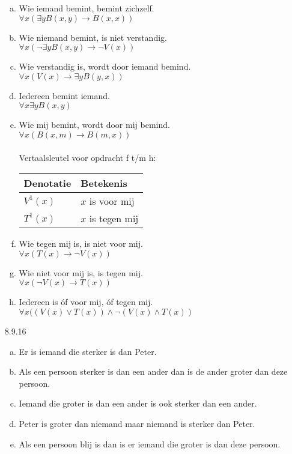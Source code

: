 \begin{enumerate}
\begin{enumerate}[(a)]
      \item
        Wie iemand bemint, bemint zichzelf.\\
        $\forall x ( \exists y B(x,y) \rightarrow B(x,x) )$
      \item
        Wie niemand bemint, is niet verstandig.\\
        $\forall x ( \neg \exists y B(x,y) \rightarrow \neg V(x))$
      \item
        Wie verstandig is, wordt door iemand bemind.\\
        $\forall x ( V(x) \to \exists y B(y,x))$
      \item
        Iedereen bemint iemand.\\
        $\forall x \exists y B(x,y)$
      \item
        Wie mij bemint, wordt door mij bemind.\\
        $\forall x ( B(x,m) \to B(m,x))$
        \\\\
        Vertaalsleutel voor opdracht f t/m h: \\
        \begin{tabular}{l|l}
          Denotatie & Betekenis\\
          \hline
          $V^1(x)$ & $x$ is voor mij\\
          $T^1(x)$ & $x$ is tegen mij\\
        \end{tabular}
      \item
        Wie tegen mij is, is niet voor mij.\\
        $\forall x ( T(x) \rightarrow \neg V(x) )$
      \item
        Wie niet voor mij is, is tegen mij.\\
        $\forall x ( \neg V(x) \rightarrow T(x) )$
      \item
        Iedereen is óf voor mij, óf tegen mij.\\
        $\forall x ( ( V(x) \vee T(x) ) \land \neg( V(x) \land T(x) )$
    \end{enumerate}

    \item[8.9.16]
    \newline
    \begin{enumerate}[(a)]
      \item Er is iemand die sterker is dan Peter.
      \item Als een persoon sterker is dan een ander dan is de ander groter dan deze persoon.
      \item Iemand die groter is dan een ander is ook sterker dan een ander.
      \item Peter is groter dan niemand maar niemand is sterker dan Peter.
      \item Als een persoon blij is dan is er iemand die groter is dan deze persoon.
    \end{enumerate}

\end{enumerate}

